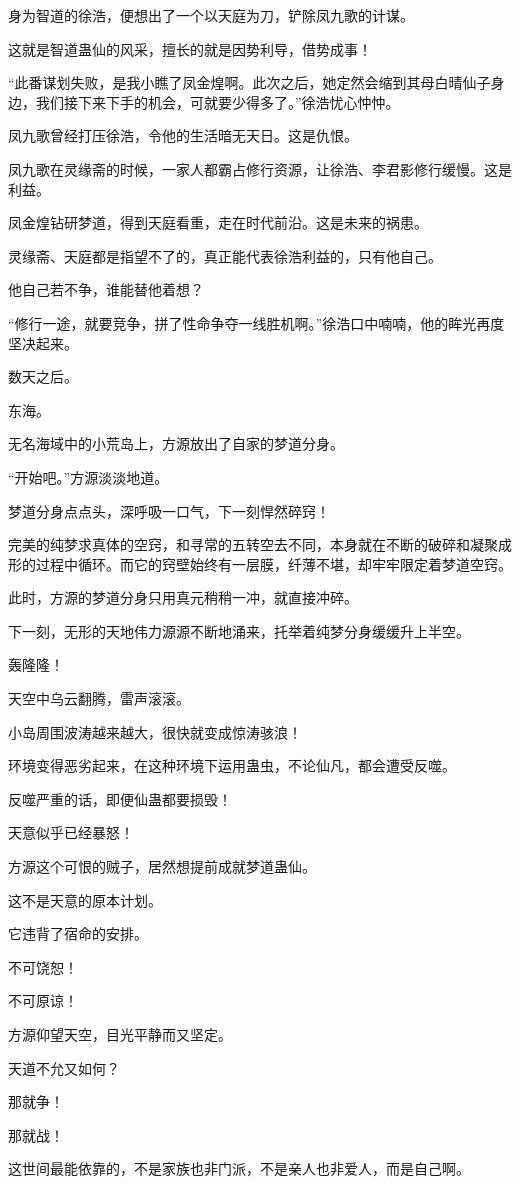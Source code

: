 \begin{this_body}
身为智道的徐浩，便想出了一个以天庭为刀，铲除凤九歌的计谋。

这就是智道蛊仙的风采，擅长的就是因势利导，借势成事！

“此番谋划失败，是我小瞧了凤金煌啊。此次之后，她定然会缩到其母白晴仙子身边，我们接下来下手的机会，可就要少得多了。”徐浩忧心忡忡。

凤九歌曾经打压徐浩，令他的生活暗无天日。这是仇恨。

凤九歌在灵缘斋的时候，一家人都霸占修行资源，让徐浩、李君影修行缓慢。这是利益。

凤金煌钻研梦道，得到天庭看重，走在时代前沿。这是未来的祸患。

灵缘斋、天庭都是指望不了的，真正能代表徐浩利益的，只有他自己。

他自己若不争，谁能替他着想？

“修行一途，就要竞争，拼了性命争夺一线胜机啊。”徐浩口中喃喃，他的眸光再度坚决起来。

数天之后。

东海。

无名海域中的小荒岛上，方源放出了自家的梦道分身。

“开始吧。”方源淡淡地道。

梦道分身点点头，深呼吸一口气，下一刻悍然碎窍！

完美的纯梦求真体的空窍，和寻常的五转空去不同，本身就在不断的破碎和凝聚成形的过程中循环。而它的窍壁始终有一层膜，纤薄不堪，却牢牢限定着梦道空窍。

此时，方源的梦道分身只用真元稍稍一冲，就直接冲碎。

下一刻，无形的天地伟力源源不断地涌来，托举着纯梦分身缓缓升上半空。

轰隆隆！

天空中乌云翻腾，雷声滚滚。

小岛周围波涛越来越大，很快就变成惊涛骇浪！

环境变得恶劣起来，在这种环境下运用蛊虫，不论仙凡，都会遭受反噬。

反噬严重的话，即便仙蛊都要损毁！

天意似乎已经暴怒！

方源这个可恨的贼子，居然想提前成就梦道蛊仙。

这不是天意的原本计划。

它违背了宿命的安排。

不可饶恕！

不可原谅！

方源仰望天空，目光平静而又坚定。

天道不允又如何？

那就争！

那就战！

这世间最能依靠的，不是家族也非门派，不是亲人也非爱人，而是自己啊。

\end{this_body}

